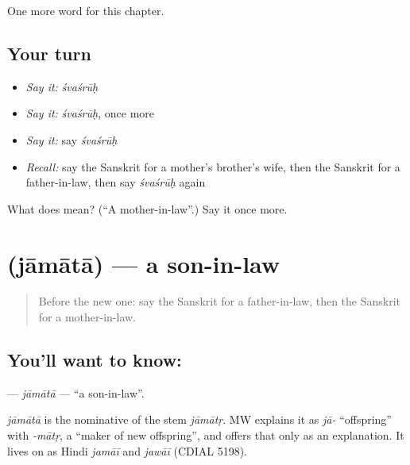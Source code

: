 \begin{grammarlens}[title={What you've built}]
One more word for this chapter.
\end{grammarlens}

\subsection*{Your turn}
\begin{itemize}
\raggedright
  \item \emph{Say it:} \emph{śvaśrūḥ}
  \item \emph{Say it:} \emph{śvaśrūḥ}, once more
  \item \emph{Say it:} say \emph{śvaśrūḥ}
  \item \emph{Recall:} say the Sanskrit for a mother's brother's wife, then the Sanskrit for a father-in-law, then say \emph{śvaśrūḥ} again
\end{itemize}

\begin{tcolorbox}[breakable,colback=teal!4,colframe=teal!35!black,title={Before you move on}]
What does  mean? (\textquotedblleft{}A mother-in-law\textquotedblright{}.) Say it once more.
\end{tcolorbox}
\section[\texorpdfstring{\sk{जामाता} (jāmātā)}{जामाता (jāmātā)}]{ (jāmātā) — a son-in-law}

\label{lesson:SA-C178-jamata}



\begin{quote}
Before the new one: say the Sanskrit for a father-in-law, then the Sanskrit for a mother-in-law.
\end{quote}

\subsection*{You'll want to know: }
\textbf{} — \emph{jāmātā} — \textquotedblleft{}a son-in-law\textquotedblright{}.

\begin{cousinweb}
\emph{jāmātā} is the nominative of the stem \emph{jāmātṛ}. MW explains it as \emph{jā-} \textquotedblleft{}offspring\textquotedblright{} with \emph{-mātṛ}, a \textquotedblleft{}maker of new offspring\textquotedblright{}, and offers that only as an explanation. It lives on as Hindi \emph{jamāī} and \emph{jawāī} (CDIAL 5198).
\end{cousinweb}


